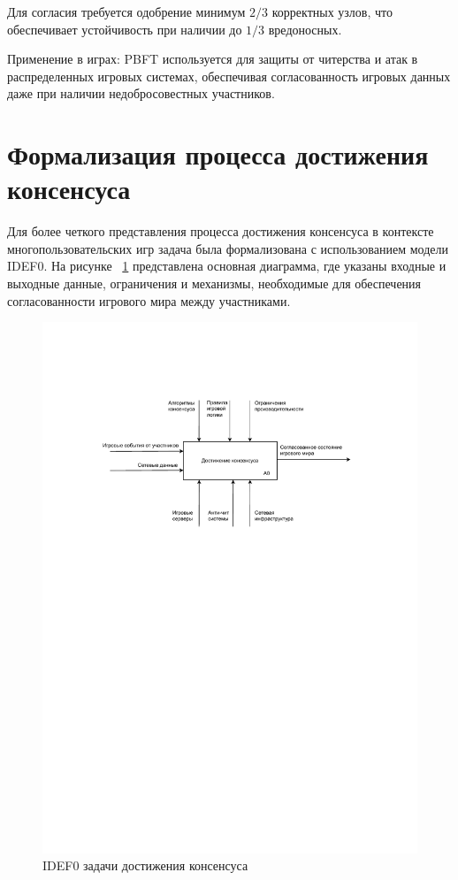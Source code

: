 Для согласия требуется одобрение минимум $2/3$ корректных узлов, что обеспечивает устойчивость при наличии до $1/3$ вредоносных.

Применение в играх: PBFT используется для защиты от читерства и атак в распределенных игровых системах, обеспечивая согласованность игровых данных даже при наличии недобросовестных участников.

\section{Формализация процесса достижения консенсуса}

Для более четкого представления процесса достижения консенсуса в контексте многопользовательских игр задача была формализована с использованием модели IDEF0. На рисунке ~\ref{img:1} представлена основная диаграмма, где указаны входные и выходные данные, ограничения и механизмы, необходимые для обеспечения согласованности игрового мира между участниками.

\begin{figure}[H]
	\centering
	\includegraphics[width=1\textwidth, trim={50 500 50 100},clip]{img/2.pdf}
	\caption{IDEF0 задачи достижения консенсуса}
	\label{img:1}
\end{figure}


